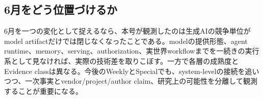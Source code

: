 \subsection*{6月をどう位置づけるか}
6月を一つの変化として捉えるなら、本号が観測したのは生成AIの競争単位がmodel artifactだけでは閉じなくなったことである。modelの提供形態、agent runtime、memory、serving、authorization、実世界workflowまでを一続きの実行系として見なければ、実際の技術差を取りこぼす。一方で各層の成熟度とEvidence classは異なる。今後のWeeklyとSpecialでも、system-levelの接続を追いつつ、一次事実とvendor/project/author claim、研究上の可能性を分離して観測することが重要になる。 \cite{src-d8e13386974c,src-e8d9fd84bddc,src-6cc910fb0183,src-02da0db00c2d,src-5ff2f715f1e6,src-8603fd60d637}
